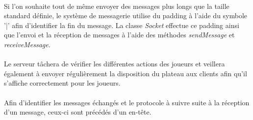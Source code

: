 \documentclass[10pt, a4paper]{article}
\begin{document}
\paragraph{}Si l'on souhaite tout de même envoyer des messages plus longs que la taille standard définie, le système de messagerie utilise du padding à l'aide du symbole '|' afin d'identifier la fin du message. La classe \textit{Socket} effectue ce padding ainsi que l'envoi et la réception de messages à l'aide des méthodes \textit{sendMessage} et \textit{receiveMessage}.
\paragraph{}Le serveur tâchera de vérifier les différentes actions des joueurs et veillera également à envoyer régulièrement la disposition du plateau aux clients afin qu'il s'affiche correctement pour les joueurs.
\paragraph{}Afin d'identifier les messages échangés et le protocole à suivre suite à la réception d'un message, ceux-ci sont précédés d'un en-tête.
\end{document}
